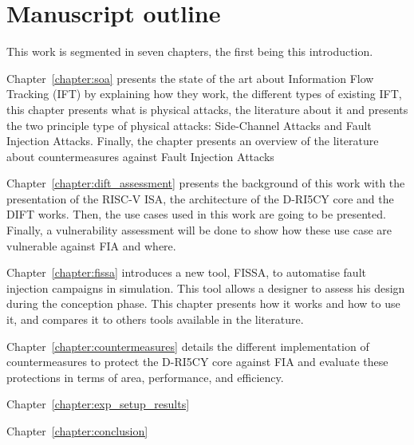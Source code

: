 \section{Manuscript outline}

This work is segmented in seven chapters, the first being this introduction.

Chapter~\ref{chapter:soa} presents the state of the art about Information Flow Tracking (IFT) by explaining how they work, the different types of existing IFT, this chapter presents what is physical attacks, the literature about it and presents the two principle type of physical attacks: Side-Channel Attacks and Fault Injection Attacks. Finally, the chapter presents an overview of the literature about countermeasures against Fault Injection Attacks

Chapter~\ref{chapter:dift_assessment} presents the background of this work with the presentation of the RISC-V ISA, the architecture of the D-RI5CY core and the DIFT works. Then, the use cases used in this work are going to be presented. Finally, a vulnerability assessment will be done to show how these use case are vulnerable against FIA and where.

Chapter~\ref{chapter:fissa} introduces a new tool, FISSA, to automatise fault injection campaigns in simulation. This tool allows a designer to assess his design during the conception phase. This chapter presents how it works and how to use it, and compares it to others tools available in the literature.

Chapter~\ref{chapter:countermeasures} details the different implementation of countermeasures to protect the D-RI5CY core against FIA and evaluate these protections in terms of area, performance, and efficiency.

Chapter~\ref{chapter:exp_setup_results}

Chapter~\ref{chapter:conclusion}

